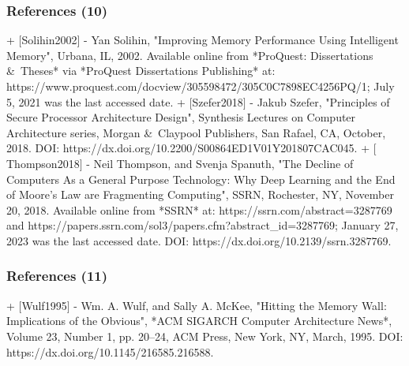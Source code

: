 \documentclass[xcolor={usenames,dvipsnames},hyperref={hyperindex,bookmarks}]{beamer}
\begin{document}
\begin{frame}
	\frametitle{References (10)}

+ $[$Solihin2002$]$
	- Yan Solihin, "Improving Memory Performance Using Intelligent Memory", Urbana, {IL}, 2002. Available online from *{ProQuest}: Dissertations {\rm \&}\ Theses* via *{ProQuest} Dissertations Publishing* at: https://www.proquest.com/docview/305598472/305C0C7898EC4256PQ/1; July 5, 2021 was the last accessed date.
+ $[$Szefer2018$]$
	- Jakub Szefer, "Principles of Secure Processor Architecture Design", Synthesis Lectures on Computer Architecture series, Morgan {\rm \&}\ Claypool Publishers, San Rafael, {CA}, October, 2018. DOI: https://dx.doi.org/10.2200/S00864ED1V01Y201807CAC045.
+ $[$Thompson2018$]$
	- Neil Thompson, and Svenja Spanuth, "The Decline of Computers As a General Purpose Technology: Why Deep Learning and the End of Moore's Law are Fragmenting Computing", {SSRN}, Rochester, {NY}, November 20, 2018. Available online from *SSRN* at: https://ssrn.com/abstract=3287769 and https://papers.ssrn.com/sol3/papers.cfm?abstract_id=3287769; January 27, 2023 was the last accessed date. DOI: https://dx.doi.org/10.2139/ssrn.3287769.


\end{frame}




















\begin{frame}
	\frametitle{References (11)}

+ $[$Wulf1995$]$
	- Wm. A. Wulf, and Sally A. {McKee}, "Hitting the Memory Wall: Implications of the Obvious", *{ACM SIGARCH} Computer Architecture News*, Volume 23, Number 1, pp. 20--24, {ACM} Press, New York, {NY}, March, 1995. DOI: https://dx.doi.org/10.1145/216585.216588.


\end{frame}























%		
%		
\end{document}
